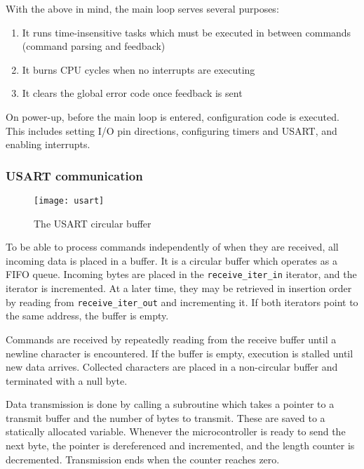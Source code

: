 With the above in mind, the main loop serves several purposes:
\begin{enumerate}
    \item It runs time-insensitive tasks which must be executed in between
    commands (command parsing and feedback)
    \item It burns CPU cycles when no interrupts are executing
    \item It clears the global error code once feedback is sent
\end{enumerate}

On power-up, before the main loop is entered, configuration code is executed.
This includes setting I/O pin directions, configuring timers and USART, and
enabling interrupts.

\subsubsection{USART communication}

\begin{figure}[ht]
    \begin{center}
        \texttt{[image: usart]}
        \caption{The USART circular buffer}
    \end{center}
\end{figure}

To be able to process commands independently of when they are received, all
incoming data is placed in a buffer. It is a circular buffer which operates as a
FIFO queue. Incoming bytes are placed in the \texttt{receive\_iter\_in}
iterator, and the iterator is incremented. At a later time, they may be
retrieved in insertion order by reading from \texttt{receive\_iter\_out} and
incrementing it. If both iterators point to the same address, the buffer is
empty.

Commands are received by repeatedly reading from the receive buffer until a
newline character is encountered. If the buffer is empty, execution is stalled
until new data arrives. Collected characters are placed in a non-circular buffer
and terminated with a null byte.

Data transmission is done by calling a subroutine which takes a pointer to a
transmit buffer and the number of bytes to transmit. These are saved to a
statically allocated variable. Whenever the microcontroller is ready to send
the next byte, the pointer is dereferenced and incremented, and the length
counter is decremented. Transmission ends when the counter reaches zero.

